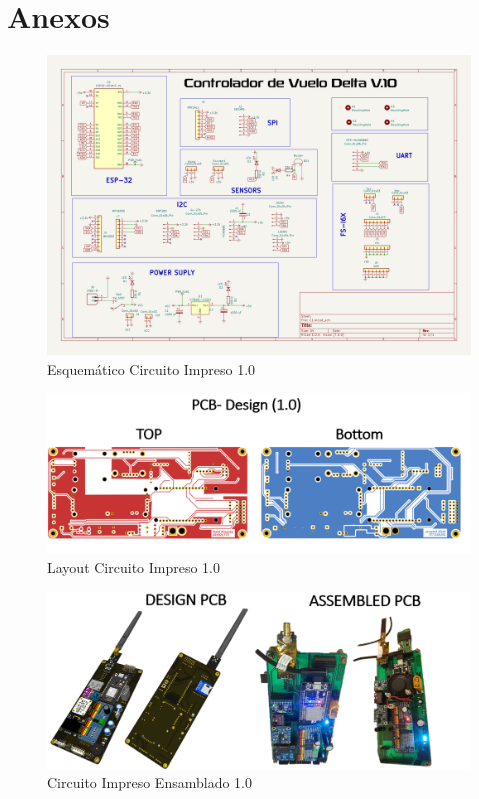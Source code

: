 
\section{Anexos}

\begin{figure}[H]
    \centering
    \includegraphics[width=\textwidth]{Imagenes/Anexos/esquematico_controlador_v1.png}
    \caption{Esquemático Circuito Impreso 1.0 }
    \label{fig:sch-1.0}
\end{figure}

\begin{figure}[H]
    \centering
    \includegraphics[width=\textwidth]{Imagenes/Anexos/layout_pcb.png}
    \caption{Layout Circuito Impreso 1.0 }
    \label{fig:pcb-1.0}
\end{figure}

\begin{figure}[H]
    \centering
    \includegraphics[width=\textwidth]{Imagenes/Anexos/pcb_primera_iteracion.png}
    \caption{Circuito Impreso Ensamblado 1.0 }
    \label{fig:pcb-ensambled-1.0}
\end{figure}

